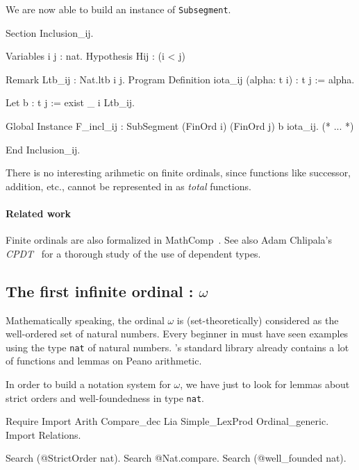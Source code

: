 
We are now able to build an instance of \texttt{Subsegment}. 

\begin{Coqsrc}
Section Inclusion_ij.

  Variables i j : nat.
  Hypothesis Hij : (i < j)%

   Remark Ltb_ij : Nat.ltb i j.
   Program Definition iota_ij  (alpha: t i) : t j :=  alpha.
 
   Let b : t j := exist _ i Ltb_ij.
   
   Global Instance F_incl_ij  : SubSegment  (FinOrd i) (FinOrd j) b iota_ij.
  (* ... *)

  End Inclusion_ij.

\end{Coqsrc}
         



\begin{remark}
 There is no interesting arihmetic on finite ordinals, since functions like successor, addition, etc.,  cannot be represented in \coq{} as \emph{total} functions.
\end{remark}

\paragraph{Related work}
Finite ordinals are also formalized in MathComp~\cite{SSR}.  See also Adam Chlipala's \emph{CPDT}~\cite{chlipalacpdt2011} for a thorough study of the use of dependent types.

\subsection{The first infinite ordinal : \texorpdfstring{$\omega$}{omega}}

Mathematically speaking, the ordinal $\omega$ is (set-theoretically) considered as the well-ordered set of
natural numbers. 
Every beginner in \coq{} must have seen examples using the type \texttt{nat} of natural numbers. \coq's standard 
library already contains a lot of functions and lemmas on Peano arithmetic. 

In order to build a notation system for $\omega$, we have just to look for lemmas about strict orders and well-foundedness in type \texttt{nat}.

\begin{Coqsrc}
Require Import Arith Compare_dec Lia Simple_LexProd Ordinal_generic.
Import Relations.

Search (@StrictOrder nat).
Search @Nat.compare.
Search (@well_founded nat).
\end{Coqsrc}

